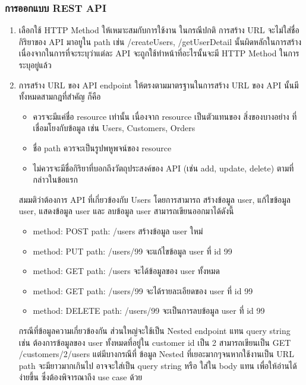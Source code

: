 \documentclass[14pt,oneside,openright,a4paper]{cpe-thai-project}
\begin{document}
    \subsubsection {การออกแบบ REST API \cite{RestAPIDesign}}

      \begin{enumerate}
        \item เลือกใช้ HTTP Method ให้เหมาะสมกับการใช้งาน
              ในกรณีปกติ การสร้าง URL จะไม่ใส่ชื่อกิริยาของ API มาอยูใน path เช่น /createUsers, /getUserDetail นั้นผิดหลักในการสร้าง เนื่องจากในการที่จะระบุว่าแต่ละ API จะถูกใช้ทำหน้าที่อะไรนั้นจะมี HTTP Method ในการระบุอยู่แล้ว 
        \item การสร้าง URL ของ API endpoint ให้ตรงตามมาตรฐานในการสร้าง URL ของ API นั้นมีทั้งหมดสามกฎที่สำคัญ ก็คือ

        \begin{itemize}
          \item ควรจะมีแค่ชื่อ resource เท่านั้น เนื่องจาก resource เป็นตัวแทนของ สิ่งของบางอย่าง ที่เชื่อมโยงกับข้อมูล เช่น Users, Customers, Orders
          \item ชื่อ path ควรจะเป็นรูปพหูพจน์ของ resource 
          \item ไม่ควรจะมีชื่อกิริยาที่บอกถึงวัตถุประสงค์ของ API (เช่น add, update, delete) ตามที่กล่าวในข้อแรก
        \end{itemize}
      
สมมติว่าต้องการ API ที่เกี่ยวข้องกับ Users โดยการสามารถ สร้างข้อมูล user, แก้ไขข้อมูล user, แสดงข้อมูล user และ ลบข้อมูล user สามารถเขียนออกมาได้ดังนี้
      
        \begin{itemize}
          \item method: POST path: /users สร้างข้อมูล user ใหม่
          \item method: PUT path: /users/99 จะแก้ไขข้อมูล user ที่ id 99
          \item method: GET path: /users จะได้ข้อมูลของ user ทั้งหมด
          \item method: GET path: /users/99 จะได้รายละเอียดของ user ที่ id 99
          \item method: DELETE path: /users/99 จะเป็นการลบข้อมูล user ที่ id 99
        \end{itemize}

กรณีที่ข้อมูลความเกี่ยวข้องกัน ส่วนใหญ่จะใช้เป็น Nested endpoint แทน query string เช่น ต้องการข้อมูลของ user ทั้งหมดที่อยู่ใน customer id เป็น 2 สามารถเขียนเป็น GET /customers/2/users 
แต่มีบางกรณีที่ ข้อมูล Nested ที่เยอะมากๆจนหากใช้งานเป็น URL path จะมียาวมากเกินไป อาจจะใส่เป็น query string หรือ ใส่ใน body แทน เพื่อให้อ่านได้ง่ายขึ้น ซึ่งต้องพิจารณาถึง use case ด้วย
  

\end{enumerate}
\end{document}
